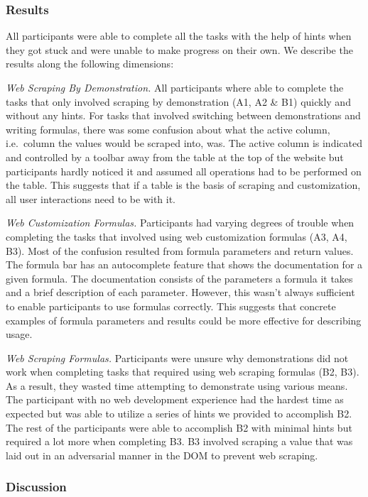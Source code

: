 \documentclass[sigconf,10pt]{acmart}
\begin{document}
\hypertarget{results}{%
\subsubsection{Results}\label{results}}

All participants were able to complete all the tasks with the help of
hints when they got stuck and were unable to make progress on their own.
We describe the results along the following dimensions:

\emph{Web Scraping By Demonstration.} All participants where able to
complete the tasks that only involved scraping by demonstration (A1, A2
\& B1) quickly and without any hints. For tasks that involved switching
between demonstrations and writing formulas, there was some confusion
about what the active column, i.e.~column the values would be scraped
into, was. The active column is indicated and controlled by a toolbar
away from the table at the top of the website but participants hardly
noticed it and assumed all operations had to be performed on the table.
This suggests that if a table is the basis of scraping and
customization, all user interactions need to be with it.

\emph{Web Customization Formulas.} Participants had varying degrees of
trouble when completing the tasks that involved using web customization
formulas (A3, A4, B3). Most of the confusion resulted from formula
parameters and return values. The formula bar has an autocomplete
feature that shows the documentation for a given formula. The
documentation consists of the parameters a formula it takes and a brief
description of each parameter. However, this wasn't always sufficient to
enable participants to use formulas correctly. This suggests that
concrete examples of formula parameters and results could be more
effective for describing usage.

\emph{Web Scraping Formulas.} Participants were unsure why
demonstrations did not work when completing tasks that required using
web scraping formulas (B2, B3). As a result, they wasted time attempting
to demonstrate using various means. The participant with no web
development experience had the hardest time as expected but was able to
utilize a series of hints we provided to accomplish B2. The rest of the
participants were able to accomplish B2 with minimal hints but required
a lot more when completing B3. B3 involved scraping a value that was
laid out in an adversarial manner in the DOM to prevent web scraping.

\hypertarget{discussion}{%
\subsubsection{Discussion}\label{discussion}}
\end{document}
